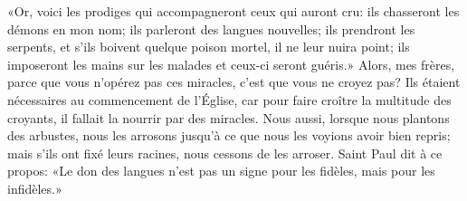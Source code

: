«Or, voici les prodiges qui accompagneront ceux qui auront cru:
	ils chasseront les démons en mon nom;
	ils parleront des langues nouvelles;
	ils prendront les serpents,
	et s’ils boivent quelque poison mortel, il ne leur nuira point;
	ils imposeront les mains sur les malades et ceux-ci seront guéris.»
Alors, mes frères, parce que vous n’opérez pas ces miracles,
	c’est que vous ne croyez pas?
Ils étaient nécessaires au commencement de l’Église,
	car pour faire croître la multitude des croyants,
	il fallait la nourrir par des miracles.
Nous aussi, lorsque nous plantons des arbustes,
	nous les arrosons jusqu’à ce que nous les voyions avoir bien repris;
	mais s’ils ont fixé leurs racines, nous cessons de les arroser.
Saint Paul dit à ce propos:
	«Le don des langues n’est pas un signe pour les fidèles,
	mais pour les infidèles.»
